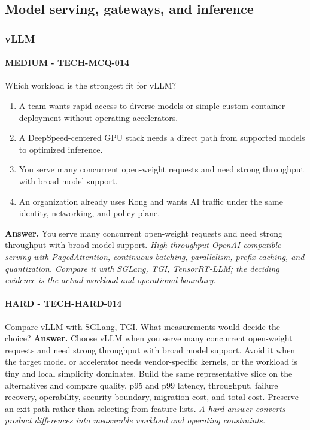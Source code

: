 \subsection{Model serving, gateways, and inference}
\subsubsection*{vLLM}
\paragraph{MEDIUM - TECH-MCQ-014} Which workload is the strongest fit for vLLM?
\begin{enumerate}[label=\Alph*.]
\item A team wants rapid access to diverse models or simple custom container deployment without operating accelerators.
\item A DeepSpeed-centered GPU stack needs a direct path from supported models to optimized inference.
\item You serve many concurrent open-weight requests and need strong throughput with broad model support.
\item An organization already uses Kong and wants AI traffic under the same identity, networking, and policy plane.
\end{enumerate}
\textbf{Answer.} You serve many concurrent open-weight requests and need strong throughput with broad model support.
\textit{High-throughput OpenAI-compatible serving with PagedAttention, continuous batching, parallelism, prefix caching, and quantization. Compare it with SGLang, TGI, TensorRT-LLM; the deciding evidence is the actual workload and operational boundary.}
\paragraph{HARD - TECH-HARD-014} Compare vLLM with SGLang, TGI. What measurements would decide the choice?
\textbf{Answer.} Choose vLLM when you serve many concurrent open-weight requests and need strong throughput with broad model support. Avoid it when the target model or accelerator needs vendor-specific kernels, or the workload is tiny and local simplicity dominates. Build the same representative slice on the alternatives and compare quality, p95 and p99 latency, throughput, failure recovery, operability, security boundary, migration cost, and total cost. Preserve an exit path rather than selecting from feature lists.
\textit{A hard answer converts product differences into measurable workload and operating constraints.}
